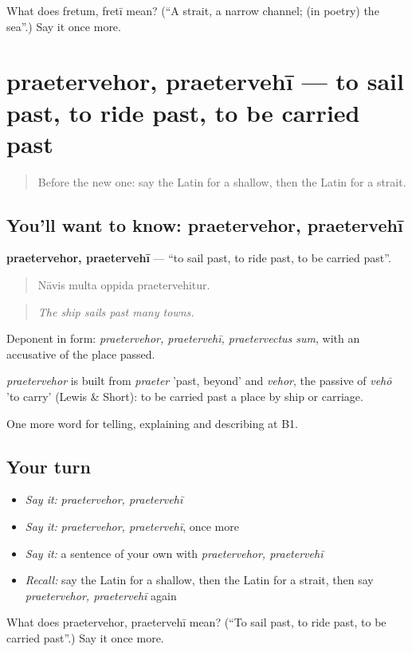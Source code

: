 \begin{tcolorbox}[breakable,colback=teal!4,colframe=teal!35!black,title={Before you move on}]
What does fretum, fretī mean? (\textquotedblleft{}A strait, a narrow channel; (in poetry) the sea\textquotedblright{}.) Say it once more.
\end{tcolorbox}
\section[praetervehor, praetervehī]{praetervehor, praetervehī — to sail past, to ride past, to be carried past}

\label{lesson:LA-C443-praetervehor}



\begin{quote}
Before the new one: say the Latin for a shallow, then the Latin for a strait.
\end{quote}

\subsection*{You'll want to know: praetervehor, praetervehī}
\textbf{praetervehor, praetervehī} — \textquotedblleft{}to sail past, to ride past, to be carried past\textquotedblright{}.

\begin{quote}
Nāvis multa oppida praetervehitur.
\end{quote}

\begin{quote}
\emph{The ship sails past many towns.}
\end{quote}

Deponent in form: \emph{praetervehor, praetervehī, praetervectus sum}, with an accusative of the place passed.

\begin{cousinweb}
\emph{praetervehor} is built from \emph{praeter} 'past, beyond' and \emph{vehor}, the passive of \emph{vehō} 'to carry' (Lewis \& Short): to be carried past a place by ship or carriage.
\end{cousinweb}

\begin{grammarlens}[title={What you've built}]
One more word for telling, explaining and describing at B1.
\end{grammarlens}

\subsection*{Your turn}
\begin{itemize}
\raggedright
  \item \emph{Say it:} \emph{praetervehor, praetervehī}
  \item \emph{Say it:} \emph{praetervehor, praetervehī}, once more
  \item \emph{Say it:} a sentence of your own with \emph{praetervehor, praetervehī}
  \item \emph{Recall:} say the Latin for a shallow, then the Latin for a strait, then say \emph{praetervehor, praetervehī} again
\end{itemize}

\begin{tcolorbox}[breakable,colback=teal!4,colframe=teal!35!black,title={Before you move on}]
What does praetervehor, praetervehī mean? (\textquotedblleft{}To sail past, to ride past, to be carried past\textquotedblright{}.) Say it once more.
\end{tcolorbox}
